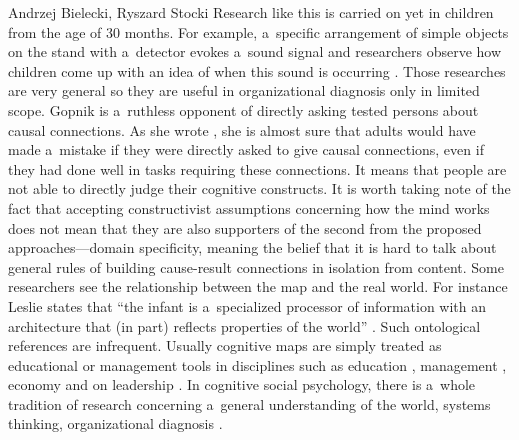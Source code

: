 \begin{artengenv2auth}{Andrzej Bielecki, Ryszard Stocki}
Research like this is carried on yet in children from the age of 30 months. For example, a~specific arrangement of simple objects on the stand with a~detector evokes a~sound signal and researchers observe how children come up with an idea of when this sound is occurring 
\parencite[][]{gopnik_causal_2001}. %
 Those researches are very general so they are useful in organizational diagnosis only in limited scope. Gopnik is a~ruthless opponent of directly asking tested persons about causal connections. As she wrote 
\parencite[][]{gopnik_theory_2004}, %
 she is almost sure that adults would have made a~mistake if they were directly asked to give causal connections, even if they had done well in tasks requiring these connections. It means that people are not able to directly judge their cognitive constructs. It is worth taking note of the fact that accepting constructivist assumptions concerning how the mind works does not mean that they are also supporters of the second from the proposed approaches---domain specificity, meaning the belief that it is hard to talk about general rules of building cause-result connections in isolation from content. Some researchers see the relationship between the map and the real world. For instance Leslie states that ``the infant is a~specialized processor of information with an architecture that (in part) reflects properties of the world'' 
\parencite[][]{hirschfeld_tomm_1994}%
. Such ontological references are infrequent. Usually cognitive maps are simply treated as educational or management tools in disciplines such as education 
\parencites[][]{moon_applied_2011}[][]{barton_mind_2016}, %
 management 
\parencites[][]{brysson_visible_2004}[][]{lengyel_capturing_2023}, %
 economy 
\parencite[][]{voss_informal_1986} %
 and on leadership 
\parencite[][]{offermann_implicit_1994}. %
 In cognitive social psychology, there is a~whole tradition of research concerning a~general understanding of the world, systems thinking, organizational diagnosis 
\parencites[][]{bielecki_analysis_2019}[][]{bielecki_systems_2010}[][]{eden_conducting_1998}.%





\end{artengenv2auth}

